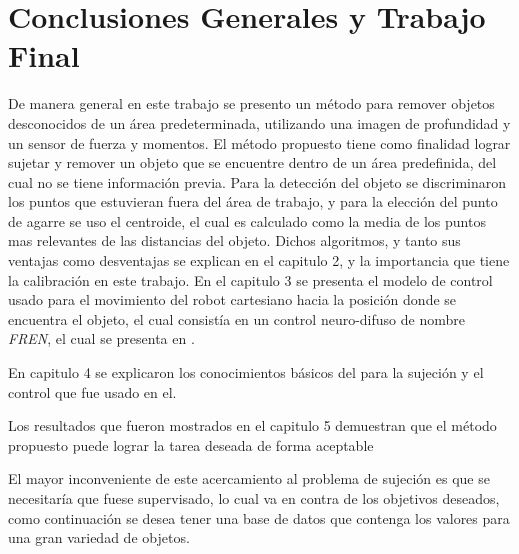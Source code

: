 \chapter{Conclusiones Generales y Trabajo Final}












De manera general en este trabajo se presento un método para remover objetos desconocidos de un área predeterminada, utilizando una imagen de profundidad y un sensor de fuerza y momentos.
El método propuesto tiene como finalidad lograr sujetar y remover un objeto que se encuentre dentro de un área predefinida, del cual no se tiene información previa.
Para la detección del objeto se discriminaron los puntos que estuvieran fuera del área de trabajo, y para la elección del punto de agarre se uso el centroide, el cual es calculado como la media de los puntos mas relevantes de las distancias del objeto. Dichos algoritmos, y tanto sus ventajas como desventajas se explican en el capitulo 2, y la importancia que tiene la calibración en este trabajo. 
En el capitulo 3 se presenta el modelo de control usado para el movimiento del robot cartesiano hacia la posición donde se encuentra el objeto, el cual consistía en un control neuro-difuso de nombre \textit{FREN}, el cual se presenta en \cite{fren}.
 
 En capitulo 4 se explicaron los conocimientos básicos del para la sujeción y el control que fue usado en el.
 
 
 Los resultados que fueron mostrados en el capitulo 5 demuestran que el método propuesto puede lograr la tarea deseada de forma aceptable%
 



El mayor inconveniente de este acercamiento al problema de sujeción es que se necesitaría que fuese supervisado, lo cual va en contra de los objetivos deseados, como continuación se desea tener una base de datos que contenga los valores para una gran variedad de objetos.


